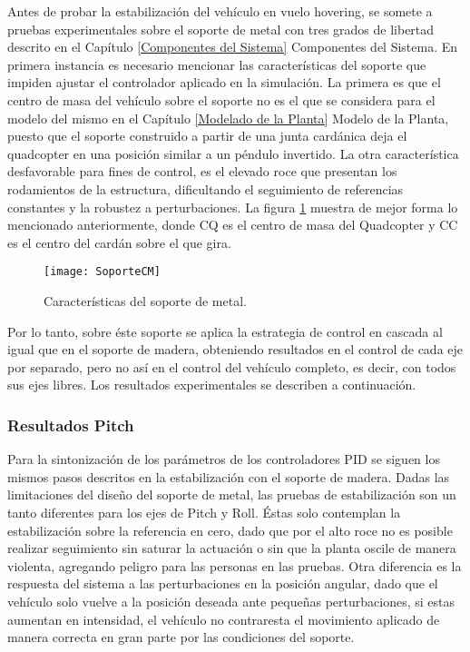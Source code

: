 \documentclass[../main.tex]{subfiles}
\begin{document}
Antes de probar la estabilización del vehículo en vuelo hovering,
se somete a pruebas experimentales sobre el soporte de metal con tres
grados de libertad descrito en el Capítulo \ref{Componentes del Sistema} Componentes del Sistema. En primera
instancia es necesario mencionar las características del soporte que
impiden ajustar el controlador aplicado en la simulación. La primera
es que el centro de masa del vehículo sobre el soporte no es el que
se considera para el modelo del mismo en el Capítulo \ref{Modelado de la Planta} Modelo de la Planta, puesto que
el soporte construido a partir de una junta cardánica deja el quadcopter
en una posición similar a un péndulo invertido. La otra característica
desfavorable para fines de control, es el elevado roce que presentan
los rodamientos de la estructura, dificultando el seguimiento de referencias
constantes y la robustez a perturbaciones. La figura \ref{fig:Carac_soport}\textbf{
} muestra de mejor forma lo mencionado anteriormente, donde CQ es el centro de masa del Quadcopter y CC es el centro del cardán sobre el que gira.

\begin{figure}[H]
\noindent \begin{centering}
\texttt{[image: SoporteCM]}
\par\end{centering}
\caption{Características del soporte de metal.\label{fig:Carac_soport}}
\end{figure}


Por lo tanto, sobre éste soporte se aplica la estrategia de control
en cascada al igual que en el soporte de madera, obteniendo resultados
en el control de cada eje por separado, pero no así en el control
del vehículo completo, es decir, con todos sus ejes libres. Los resultados
experimentales se describen a continuación.

\subsubsection{Resultados Pitch}

Para la sintonización de los parámetros de los controladores PID se
siguen los mismos pasos descritos en la estabilización con el soporte
de madera. Dadas las limitaciones del diseño del soporte de metal, las pruebas
de estabilización son un tanto diferentes para los ejes de Pitch y
Roll. Éstas solo contemplan la estabilización sobre la referencia
en cero, dado que por el alto roce no es posible realizar seguimiento
sin saturar la actuación o sin que la planta oscile de manera violenta,
agregando peligro para las personas en las pruebas. Otra diferencia es la respuesta
del sistema a las perturbaciones en la posición angular, dado que
el vehículo solo vuelve a la posición deseada ante pequeñas perturbaciones,
si estas aumentan en intensidad, el vehículo no contraresta el movimiento
aplicado de manera correcta en gran parte por las condiciones del
soporte.
\end{document}
